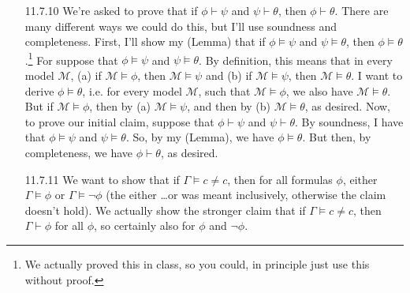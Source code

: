 \begin{itemize}
                          \item[11.7.10] We're asked to prove that if
                            $\phi\vdash\psi$ and $\psi\vdash\theta$,
                            then $\phi\vdash\theta$. There are many
                            different ways we could do this, but I'll
                            use soundness and completeness. First,
                            I'll show my (Lemma) that  if
                            $\phi\vDash\psi$ and $\psi\vDash\theta$,
                            then $\phi\vDash\theta$.\footnote{We
                              actually proved this in class, so you
                              could, in principle just use this
                              without proof.} For suppose that
                            $\phi\vDash\psi$ and
                            $\psi\vDash\theta$. By definition, this
                            means that in every 
                            model $\mathcal{M}$, (a) if $\mathcal{M}\vDash
                            \phi$, then $\mathcal{M}\vDash \psi$ and (b)
                            if $\mathcal{M}\vDash \psi$, then
                            $\mathcal{M}\vDash\theta$. I want to
                            derive $\phi\vDash\theta$, i.e. for every
                            model $\mathcal{M}$,
                            such that $\mathcal{M}\vDash\phi$, we also
                            have $\mathcal{M}\vDash\theta$. But if
                            $\mathcal{M}\vDash\phi$, then by (a)
                            $\mathcal{M}\vDash\psi$, and then by (b)
                            $\mathcal{M}\vDash\theta$, as desired. Now,
                            to prove our initial claim, suppose that
                            $\phi\vdash\psi$ and $\psi\vdash\theta$. By
                            soundness, I have that  $\phi\vDash\psi$
                            and $\psi\vDash\theta$. So, by my (Lemma), we
                            have $\phi\vDash\theta$. But then, by
                            completeness, we have $\phi\vdash\theta$,
                            as desired.

                            \item[11.7.11] We want to show that if
                              $\Gamma\vDash c\neq c$, then for all
                              formulas $\phi$, either $\Gamma\vDash\phi$ or
                              $\Gamma\vDash\neg\phi$ (the either
                              \dots or was meant
                              inclusively, otherwise the claim doesn't
                              hold). We actually show the stronger
                              claim that if $\Gamma\vDash c\neq c$,
                              then $\Gamma\vdash\phi$ for all $\phi$,
                              so certainly also for $\phi$ and
                              $\neg\phi$.


\end{itemize}
